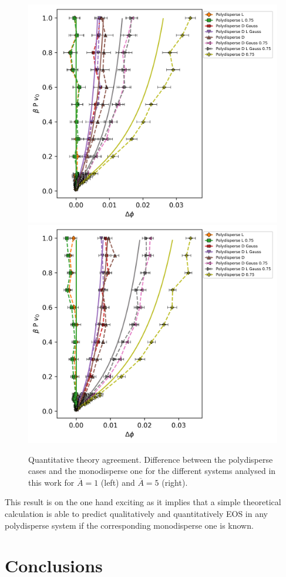 \documentclass[journal=jacsat,manuscript=article]{achemso}
\begin{document}
\begin{figure}[!h]
	\centering
	\includegraphics[width=0.45 \columnwidth]{Figures/Deltaphi_P_A1.png}
	\includegraphics[width=0.45 \columnwidth]{Figures/Deltaphi_P_A5.png}
	\caption{Quantitative theory agreement. Difference between the polydisperse cases and the monodisperse one for the different systems analysed in this work for $\overline{A} = 1$ (left) and $\overline{A} = 5$ (right).}
	\label{fig:DeltaP_P}
\end{figure}

This result is on the one hand exciting as it implies that a simple theoretical calculation is able to predict qualitatively and quantitatively EOS in any  polydisperse system if the corresponding monodisperse one is known. 







\section{Conclusions}
\end{document}
